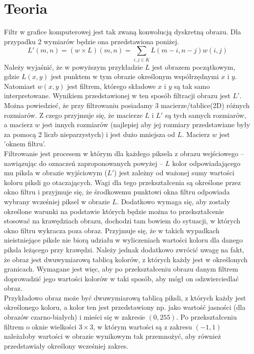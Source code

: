 \section{Teoria}
\label{aGabor_teoria}
Filtr w grafice komputerowej jest tak zwaną konwolucją dyskretną \cite{Tadeusiewicz} obrazu. Dla przypadku 2 wymiarów będzie ona przedstawiona poniżej.
$$
	L'(m, n) = (w \times L)(m, n) = \sum_{i, j \in K}L(m-i, n-j)w(i, j)	
$$
Należy wyjaśnić, że w powyższym przykładzie $L$ jest obrazem początkowym, gdzie $L(x, y)$ jest punktem w tym obrazie określonym współrzędnymi $x$ i $y$. Natomiast $w(x, y)$ jest filtrem, którego składowe $x$ i $y$ są tak samo interpretowane. Wynikiem przedstawionej w ten sposób filtracji obrazu jest $L'$.\\
Można powiedzieć, że przy filtrowaniu posiadamy 3 macierze/tablice(2D) różnych rozmiarów. Z czego przyjmuje się, że macierze $L$ i $L'$ są tych samych rozmiarów, a macierz $w$ jest innych rozmiarów (najlepiej aby jej rozmiary przedstawiane były za pomocą 2 liczb nieparzystych) i jest dużo mniejsza od $L$. Macierz $w$ jest 'oknem filtru'.\\

Filtrowanie jest procesem w którym dla każdego piksela z obrazu wejściowego -- nawiązując do oznaczeń zaproponowanych powyżej -- $L$ kolor odpowiadającego mu piksla w obrazie wyjściowym ($L'$) jest zależny od ważonej sumy wartości koloru piksli go otaczających. Wagi dla tego przekształcenia są określone przez okno filtru i przyjmuje się, że środkowemu punktowi okna filtru odpowiada wybrany wcześniej piksel w obrazie $L$. Dodatkowo wymaga się, aby zostały określone warunki na podstawie których będzie można to przekształcenie stosować na krawędziach obrazu, dochodzi tam bowiem do sytuacji, w których okno filtru wykracza poza obraz. Przyjmuje się, że w takich wypadkach nieistniejące piksle nie biorą udziału w wyliczeniach wartości koloru dla danego piksla leżącego przy krawędzi. Należy jednak dodatkowo zwrócić uwagę na fakt, że obraz jest dwuwymiarową tablicą kolorów, z których każdy jest w określonych granicach. Wymagane jest więc, aby po przekształceniu obrazu danym filtrem doprowadzić jego wartości kolorów w taki sposób, aby mógł on odzwierciedlać obraz.\\

Przykładowo obraz może być dwuwymiarową tablicą piksli, z których każdy jest określonego koloru, a kolor ten jest przedstawiony np. jako wartość jasności (dla obrazów czarno-białych) i mieści się w zakresie $(0, 255)$. Po przekształceniu filtrem o oknie wielkości $3\times3$, w którym wartości są z zakresu $(-1, 1)$ należałoby wartości w obrazie wynikowym tak przemnożyć, aby również przedstawiały określony wcześniej zakres. 


